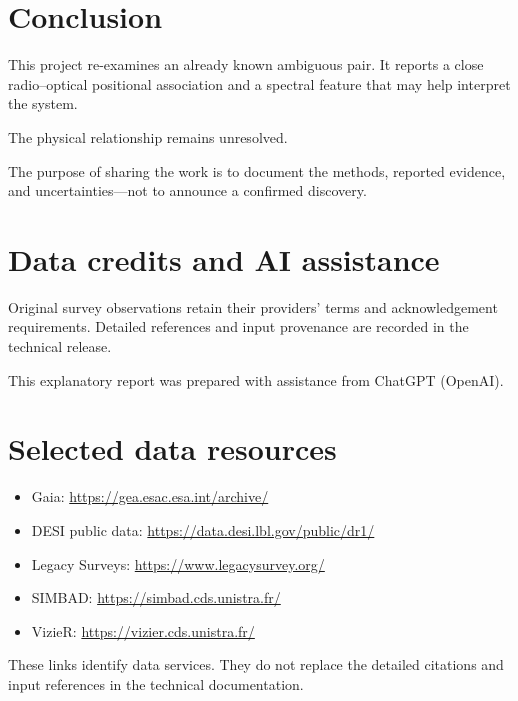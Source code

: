 \documentclass[11pt,a4paper]{article}
\begin{document}
\section{Conclusion}

This project re-examines an already known ambiguous pair.
It reports a close radio--optical positional association
and a spectral feature that may help interpret the system.

The physical relationship remains unresolved.

The purpose of sharing the work is to document the methods,
reported evidence, and uncertainties---not to announce
a confirmed discovery.

\section*{Data credits and AI assistance}

Original survey observations retain their providers' terms
and acknowledgement requirements. Detailed references and
input provenance are recorded in the technical release.

This explanatory report was prepared
with assistance from ChatGPT (OpenAI).

\section*{Selected data resources}

\begin{itemize}
    \item Gaia:
    \url{https://gea.esac.esa.int/archive/}

    \item DESI public data:
    \url{https://data.desi.lbl.gov/public/dr1/}

    \item Legacy Surveys:
    \url{https://www.legacysurvey.org/}

    \item SIMBAD:
    \url{https://simbad.cds.unistra.fr/}

    \item VizieR:
    \url{https://vizier.cds.unistra.fr/}
\end{itemize}

These links identify data services. They do not replace
the detailed citations and input references in the
technical documentation.
\end{document}
